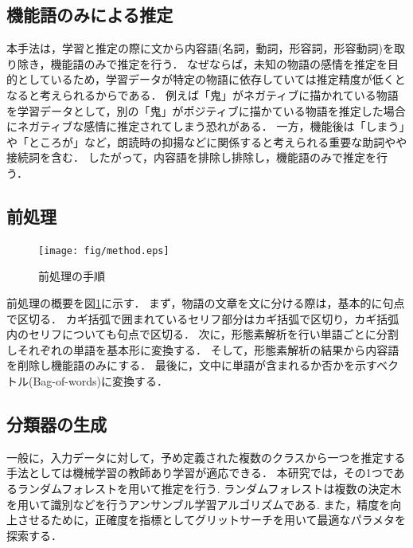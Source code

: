 \subsection{機能語のみによる推定}
本手法は，学習と推定の際に文から内容語(名詞，動詞，形容詞，形容動詞)を取り除き，機能語のみで推定を行う．
なぜならば，未知の物語の感情を推定を目的としているため，学習データが特定の物語に依存していては推定精度が低くとなると考えられるからである．
例えば「鬼」がネガティブに描かれている物語を学習データとして，別の「鬼」がポジティブに描かている物語を推定した場合にネガティブな感情に推定されてしまう恐れがある．
一方，機能後は「しまう」や「ところが」など，朗読時の抑揚などに関係すると考えられる重要な助詞やや接続詞を含む．
したがって，内容語を排除し排除し，機能語のみで推定を行う．

\subsection{前処理}
\begin{figure}[ht]
  \begin{center}
    \texttt{[image: fig/method.eps]}
    \caption{前処理の手順}
    \label{fig:pre}
  \end{center}
\end{figure}

前処理の概要を図\ref{fig:pre}に示す．
まず，物語の文章を文に分ける際は，基本的に句点で区切る．
カギ括弧で囲まれているセリフ部分はカギ括弧で区切り，カギ括弧内のセリフについても句点で区切る．
次に，形態素解析を行い単語ごとに分割しそれぞれの単語を基本形に変換する．
そして，形態素解析の結果から内容語を削除し機能語のみにする．
最後に，文中に単語が含まれるか否かを示すベクトル(Bag-of-words)に変換する．

\subsection{分類器の生成}
一般に，入力データに対して，予め定義された複数のクラスから一つを推定する手法としては機械学習の教師あり学習が適応できる．
本研究では，その1つであるランダムフォレストを用いて推定を行う.
ランダムフォレストは複数の決定木を用いて識別などを行うアンサンブル学習アルゴリズムである.
また，精度を向上させるために，正確度を指標としてグリットサーチを用いて最適なパラメタを探索する．
